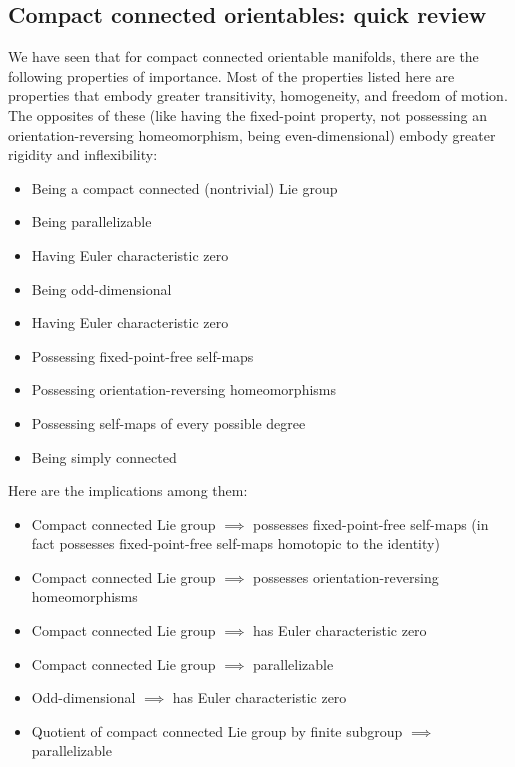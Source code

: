 \documentclass[a4paper]{amsart}
\begin{document}
\subsection{Compact connected orientables: quick review}

We have seen that for compact connected orientable manifolds, there
are the following properties of importance. Most of the properties
listed here are properties that embody greater transitivity,
homogeneity, and freedom of motion. The opposites of these (like
having the fixed-point property, not possessing an
orientation-reversing homeomorphism, being even-dimensional) embody
greater rigidity and inflexibility:

\begin{itemize}

\item Being a compact connected (nontrivial) Lie group

\item Being parallelizable

\item Having Euler characteristic zero

\item Being odd-dimensional

\item Having Euler characteristic zero

\item Possessing fixed-point-free self-maps

\item Possessing orientation-reversing homeomorphisms

\item Possessing self-maps of every possible degree

\item Being simply connected

\end{itemize}

Here are the implications among them:

\begin{itemize}

\item Compact connected Lie group $\implies$ possesses
  fixed-point-free self-maps (in fact possesses fixed-point-free
  self-maps homotopic to the identity)

\item Compact connected Lie group $\implies$ possesses
  orientation-reversing homeomorphisms

\item Compact connected Lie group $\implies$ has Euler characteristic zero

\item Compact connected Lie group $\implies$ parallelizable

\item Odd-dimensional $\implies$ has Euler characteristic zero

\item Quotient of compact connected Lie group by finite subgroup
  $\implies$ parallelizable

\end{itemize}
\end{document}
